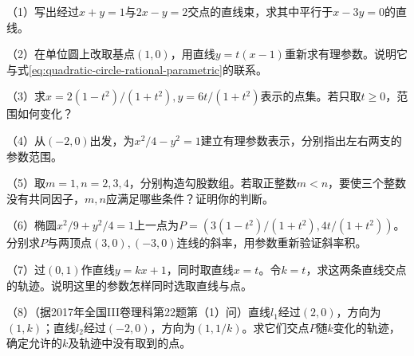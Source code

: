 \begin{exercise}
\mbox{}\par\nobreak

\begin{samepage}
（1）写出经过\(x+y=1\)与\(2x-y=2\)交点的直线束，求其中平行于\(x-3y=0\)的直线。
\par
\end{samepage}

\begin{samepage}
（2）在单位圆上改取基点\((1,0)\)，用直线\(y=t(x-1)\)重新求有理参数。说明它与式\eqref{eq:quadratic-circle-rational-parametric}的联系。
\par
\end{samepage}

\begin{samepage}
（3）求\(x=2(1-t^2)/(1+t^2),y=6t/(1+t^2)\)表示的点集。若只取\(t\ge0\)，范围如何变化？
\par
\end{samepage}

\begin{samepage}
（4）从\((-2,0)\)出发，为\(x^2/4-y^2=1\)建立有理参数表示，分别指出左右两支的参数范围。
\par
\end{samepage}

\begin{samepage}
（5）取\(m=1,n=2,3,4\)，分别构造勾股数组。若取正整数\(m<n\)，要使三个整数没有共同因子，\(m,n\)应满足哪些条件？证明你的判断。
\par
\end{samepage}

\begin{samepage}
（6）椭圆\(x^2/9+y^2/4=1\)上一点为\(P=(3(1-t^2)/(1+t^2),4t/(1+t^2))\)。分别求\(P\)与两顶点\((3,0),(-3,0)\)连线的斜率，用参数重新验证斜率积。
\par
\end{samepage}

\begin{samepage}
（7）过\((0,1)\)作直线\(y=kx+1\)，同时取直线\(x=t\)。令\(k=t\)，求这两条直线交点的轨迹。说明这里的参数怎样同时选取直线与点。
\par
\end{samepage}

\begin{samepage}
（8）（据2017年全国III卷理科第22题第（1）问）直线\(l_1\)经过\((2,0)\)，方向为\((1,k)\)；直线\(l_2\)经过\((-2,0)\)，方向为\((1,1/k)\)。求它们交点\(P\)随\(k\)变化的轨迹，确定允许的\(k\)及轨迹中没有取到的点。
\par
\end{samepage}

\end{exercise}

